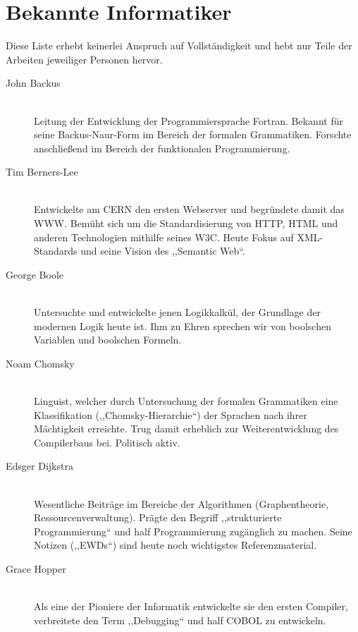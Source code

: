 \chapter{Bekannte Informatiker}
%
Diese Liste erhebt keinerlei Anspruch auf Vollständigkeit und hebt nur Teile der Arbeiten jeweiliger Personen hervor.
%
\begin{description}
  \item[John Backus ] \hfill{} \\
    Leitung der Entwicklung der Programmiersprache Fortran.
    Bekannt für seine Backus-Naur-Form im Bereich der formalen Grammatiken.
    Forschte anschließend im Bereich der funktionalen Programmierung.

   \item[Tim Berners-Lee ] \hfill{} \\
    Entwickelte am CERN den ersten Webserver und begründete damit das WWW.
    Bemüht sich um die Standardisierung von HTTP, HTML und anderen Technologien mithilfe seines W3C.
    Heute Fokus auf XML-Standards und seine Vision des ,,Semantic Web``.

  \item[George Boole ] \hfill{} \\
    Untersuchte und entwickelte jenen Logikkalkül, der Grundlage der modernen Logik heute ist.
    Ihm zu Ehren sprechen wir von boolschen Variablen und boolschen Formeln.

  \item[Noam Chomsky ] \hfill{} \\
    Linguist, welcher durch Untersuchung der formalen Grammatiken eine Klassifikation (,,Chomsky-Hierarchie``) der Sprachen nach ihrer Mächtigkeit erreichte.
    Trug damit erheblich zur Weiterentwicklung des Compilerbaus bei.
    Politisch aktiv.

  \item[Edsger Dijkstra ] \hfill{} \\
    Wesentliche Beiträge im Bereiche der Algorithmen (Graphentheorie, Ressourcenverwaltung).
    Prägte den Begriff ,,strukturierte Programmierung`` und half Programmierung zugänglich zu machen.
    Seine Notizen (,,EWDs``) sind heute noch wichtigstes Referenzmaterial.

  \item[Grace Hopper ] \hfill{} \\
    Als eine der Pioniere der Informatik entwickelte sie den ersten Compiler, verbreitete den Term ,,Debugging`` und half COBOL zu entwickeln.


\end{description}
